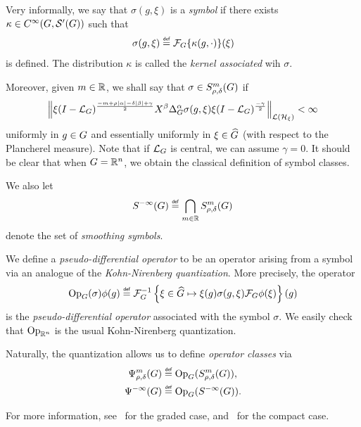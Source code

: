 Very informally,
we say that $\sigma(g, \xi)$ is a \emph{symbol} if there exists $\kappa \in \SmoothFunctions {\Group, \TemperedDistributions \Group}$ such that
\begin{align*}
    \sigma(g, \xi) \defeq \Fourier \{\kappa(g, \dummy)\}(\xi)
\end{align*}
is defined.
The distribution $\kappa$ is called the \emph{kernel associated} wih $\sigma$.

Moreover,
given $m \in \R$,
we shall say that $\sigma \in \SymbolClass m {\rho, \delta}$ if
\begin{align*}
    \norm [\Lin {\mathcal H_\xi}] {%
        \xi \BesselPotential {-m + \rho \abs \alpha - \delta \abs \beta + \gamma}
        \LeftDifferentialOperator \beta \DifferenceOperatorOrder \alpha \sigma(g, \xi)
        \xi \BesselPotential {-\gamma}
    }
    < \infty
\end{align*}
uniformly in $g \in \Group$
and essentially uniformly in $\xi \in \dualGroup \Group$ (with respect to the Plancherel measure).
Note that if $\Laplacian$ is central,
we can assume $\gamma = 0$.
It should be clear that when $\Group = \R^n$,
we obtain the classical definition of symbol classes.

We also let
\begin{align*}
    \SmoothingSymbols \defeq \bigcap_{m \in \R} \SymbolClass m {\rho, \delta}
\end{align*}
denote the set of \emph{smoothing symbols}.

We define a \emph{pseudo-differential operator} to be an operator arising from a symbol via an analogue of the \emph{Kohn-Nirenberg quantization}.
More precisely,
the operator
\begin{align*}
    \Op(\sigma) \phi(g)
    \defeq \InverseFourier \left\{ \xi \in \dualGroup \Group \mapsto \xi(g) \sigma(g, \xi) \Fourier \phi(\xi)\right\}(g)
\end{align*}
is the \emph{pseudo-differential operator} associated with the symbol $\sigma$.
We easily check that $\Op [\R^n]$ is the usual Kohn-Nirenberg quantization.

Naturally,
the quantization allows us to define \emph{operator classes} via
\begin{align*}
    \OperatorClass m {\rho, \delta} &\defeq \Op(\SymbolClass m {\rho, \delta}),\\
    \SmoothingOperators &\defeq \Op(\SmoothingSymbols).
\end{align*}

For more information,
see~\cite[Section 5.1]{FischerRuzhansky16} for the graded case,
and~\cite[Section 3.1]{Fischer2015} for the compact case.

